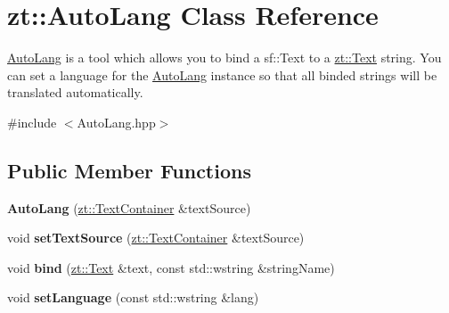 \hypertarget{classzt_1_1_auto_lang}{}\section{zt\+:\+:Auto\+Lang Class Reference}
\label{classzt_1_1_auto_lang}


\hyperlink{classzt_1_1_auto_lang}{Auto\+Lang} is a tool which allows you to bind a sf\+::\+Text to a \hyperlink{classzt_1_1_text}{zt\+::\+Text} string. You can set a language for the \hyperlink{classzt_1_1_auto_lang}{Auto\+Lang} instance so that all binded strings will be translated automatically.  




{\ttfamily \#include $<$Auto\+Lang.\+hpp$>$}

\subsection*{Public Member Functions}
\begin{DoxyCompactItemize}
\item 
\mbox{\label{classzt_1_1_auto_lang_ac7181e6ade4311ef58f12d30087249df}} 
{\bfseries Auto\+Lang} (\hyperlink{classzt_1_1_text_container}{zt\+::\+Text\+Container} \&text\+Source)
\item 
\mbox{\label{classzt_1_1_auto_lang_af7db0f1b9b8d89da29dc421c1e1c8ba7}} 
void {\bfseries set\+Text\+Source} (\hyperlink{classzt_1_1_text_container}{zt\+::\+Text\+Container} \&text\+Source)
\item 
\mbox{\label{classzt_1_1_auto_lang_a55170fd376502297c2dbac5467b13924}} 
void {\bfseries bind} (\hyperlink{classzt_1_1_text}{zt\+::\+Text} \&text, const std\+::wstring \&string\+Name)
\item 
\mbox{\label{classzt_1_1_auto_lang_a866025aba2815ad38d0c07df2f9b01e7}} 
void {\bfseries set\+Language} (const std\+::wstring \&lang)
\end{DoxyCompactItemize}
